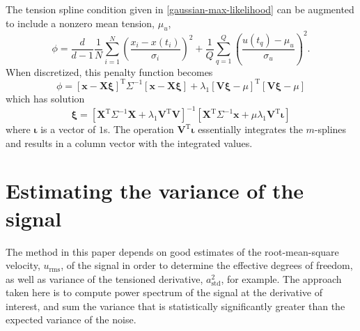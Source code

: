 \documentclass[10pt,journal]{IEEEtran}
\begin{document}
The tension spline condition given in \ref{gaussian-max-likelihood} can be augmented to include a nonzero mean tension, $\mu_u$,
\begin{equation}
\phi =  \frac{d}{d-1} \frac{1}{N} \sum^N _{i=1}\left( \frac{x_i - x(t_i)}{\sigma_i} \right)^2 + \frac{1}{Q} \sum^{Q}_{q=1}  \left(  \frac{u(t_q)-\mu_u}{\sigma_u} \right)^2.
\end{equation}
When discretized, this penalty function becomes
\begin{equation}
\phi = \left[ \mathbf{x} - \mathbf{X} \mathbf{\xi} \right]^{\textrm{T}} \Sigma^{-1} \left[ \mathbf{x} - \mathbf{X} \mathbf{\xi}\right]
+ \lambda_1 \left[\mathbf{V}\mathbf{\xi} - \mu \right]^{\textrm{T}} \left[ \mathbf{V}\mathbf{\xi} - \mu \right]
\end{equation}
which has solution
\begin{equation}
\mathbf{\xi} = \left[ \mathbf{X}^{\textrm{T}} \Sigma^{-1} \mathbf{X} + \lambda_1 \mathbf{V}^{\textrm{T}} \mathbf{V} \right]^{-1}   \left[ \mathbf{X}^{\textrm{T}} \Sigma^{-1} \mathbf{x} +  \mu \lambda_1 \mathbf{V}^{\textrm{T}} \mathbf{\iota} \right]
\end{equation}
where $\mathbf{\iota}$ is a vector of $1$s. The operation $\mathbf{V}^{\textrm{T}} \mathbf{\iota}$ essentially integrates the $m$-splines and results in a column vector with the integrated values.


\section{Estimating the variance of the signal}
\label{sec:variance_estimate}

The method in this paper depends on good estimates of the root-mean-square velocity, $u_{\textrm{rms}}$, of the signal in order to determine the effective degrees of freedom, as well as variance of the tensioned derivative, $a_{\textrm{std}}^2$, for example. The approach taken here is to compute power spectrum of the signal at the derivative of interest, and sum the variance that is statistically significantly greater than the expected variance of the noise.
\end{document}
